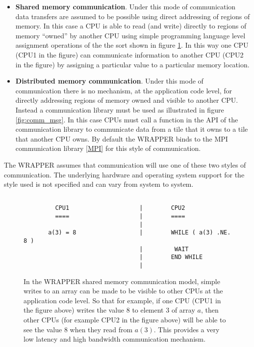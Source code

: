 \begin{itemize}
\item {\bf Shared memory communication}.  Under this mode of
  communication data transfers are assumed to be possible using direct
  addressing of regions of memory.  In this case a CPU is able to read
  (and write) directly to regions of memory ``owned'' by another CPU
  using simple programming language level assignment operations of the
  the sort shown in figure \ref{fig:simple_assign}.  In this way one
  CPU (CPU1 in the figure) can communicate information to another CPU
  (CPU2 in the figure) by assigning a particular value to a particular
  memory location.

\item {\bf Distributed memory communication}.  Under this mode of
  communication there is no mechanism, at the application code level,
  for directly addressing regions of memory owned and visible to
  another CPU. Instead a communication library must be used as
  illustrated in figure \ref{fig:comm_msg}. In this case CPUs must
  call a function in the API of the communication library to
  communicate data from a tile that it owns to a tile that another CPU
  owns. By default the WRAPPER binds to the MPI communication library
  \ref{MPI} for this style of communication.
\end{itemize}

The WRAPPER assumes that communication will use one of these two styles
of communication.  The underlying hardware and operating system support
for the style used is not specified and can vary from system to system.

\begin{figure}
\begin{verbatim}

         CPU1                    |        CPU2
         ====                    |        ====
                                 |
       a(3) = 8                  |        WHILE ( a(3) .NE. 8 ) 
                                 |         WAIT
                                 |        END WHILE
                                 |
\end{verbatim}
\caption{In the WRAPPER shared memory communication model, simple writes to an
array can be made to be visible to other CPUs at the application code level.
So that for example, if one CPU (CPU1 in the figure above) writes the value $8$ to 
element $3$ of array $a$, then other CPUs (for example CPU2 in the figure above)
will be able to see the value $8$ when they read from $a(3)$.
This provides a very low latency and high bandwidth communication 
mechanism.
} \label{fig:simple_assign}
\end{figure}

